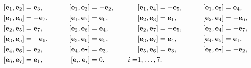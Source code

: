 \begin{alignat*}{4}


&[\bold{e}_{1},\bold{e}_{2}]=\bold{e}_{3}, &\qquad


[\bold{e}_{1},\bold{e}_{3}]&=-\bold{e}_{2}, &\quad


&[\bold{e}_{1},\bold{e}_{4}]=-\bold{e}_{5}, &\qquad


&[\bold{e}_{1},\bold{e}_{5}]=\bold{e}_{4}, \\


%


&[\bold{e}_{1},\bold{e}_{6}]=-\bold{e}_{7}, &\qquad


[\bold{e}_{1},\bold{e}_{7}]&=\bold{e}_{6}, &\quad


&[\bold{e}_{2},\bold{e}_{3}]=\bold{e}_{1}, &\qquad


&[\bold{e}_{2},\bold{e}_{4}]=-\bold{e}_{6}, \\


%


&[\bold{e}_{2},\bold{e}_{5}]=\bold{e}_{7}, &\qquad


[\bold{e}_{2},\bold{e}_{6}]&=\bold{e}_{4}, &\quad


&[\bold{e}_{2},\bold{e}_{7}]=-\bold{e}_{5}, &\qquad


&[\bold{e}_{3},\bold{e}_{4}]=-\bold{e}_{7}, \\


%


&[\bold{e}_{3},\bold{e}_{5}]=-\bold{e}_{6}, &\qquad


[\bold{e}_{3},\bold{e}_{6}]&=\bold{e}_{5}, &\quad


&[\bold{e}_{3},\bold{e}_{7}]=\bold{e}_{4}, &\qquad


&[\bold{e}_{4},\bold{e}_{5}]=\bold{e}_{1}, \\


%


&[\bold{e}_{4},\bold{e}_{6}]=\bold{e}_{2}, &\qquad


[\bold{e}_{4},\bold{e}_{7}]&=\bold{e}_{3}, &\quad


&[\bold{e}_{5},\bold{e}_{6}]=\bold{e}_{3}, &\qquad


&[\bold{e}_{5},\bold{e}_{7}]=-\bold{e}_{2}, \\


%


&[\bold{e}_{6},\bold{e}_{7}]=\bold{e}_{1}, &\qquad


[\bold{e}_{i},\bold{e}_{i}]&=0, &\quad i=&1,\dotsc,7. & \ & \


\end{alignat*}





